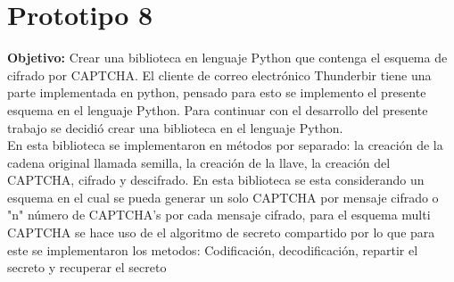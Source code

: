 \documentclass[12pt,oneside,onecolumn,openany]{report}
\begin{document}
\section{Prototipo 8}
\textbf{Objetivo:} Crear una biblioteca en lenguaje Python que contenga el esquema de cifrado por CAPTCHA.
El cliente de correo electrónico Thunderbir tiene una parte implementada en python, pensado para esto se implemento el presente esquema en el lenguaje Python. Para continuar con el desarrollo del presente trabajo se decidió crear una biblioteca en el lenguaje Python.\\
En esta biblioteca se implementaron en métodos por separado: la creación de la cadena original llamada semilla, la creación de la llave, la creación del CAPTCHA, cifrado y descifrado.
En esta biblioteca se esta considerando un esquema en el cual se pueda generar un solo CAPTCHA por mensaje cifrado o "n" número de CAPTCHA's por cada mensaje cifrado, para el esquema multi CAPTCHA se hace uso de el algoritmo de secreto compartido por lo que para este se implementaron los metodos: Codificación, decodificación, repartir el secreto y recuperar el secreto
\end{document}
